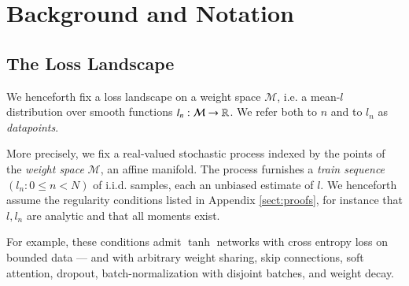 \documentclass{article}
\theoremstyle{plain}
\theoremstyle{definition}
\newcommand{\Mm}{\mathcal{M}}
\begin{document}
\section{Background and Notation} \label{sect:background}


    \subsection{The Loss Landscape}


        We henceforth fix a loss landscape on a weight space $\Mm$, i.e. a
        mean-$l$ distribution over smooth functions $l_n:\Mm\to\RR$.  We refer
        both to $n$ and to $l_n$ as \emph{datapoints}.


        More precisely, we fix a real-valued stochastic process indexed by the
        points of the \emph{weight space} $\Mm$, an affine manifold.  The
        process furnishes a \emph{train sequence} $(l_n: 0\leq n<N)$ of i.i.d.
        samples, each an unbiased estimate of $l$. We henceforth assume the
        regularity conditions listed in Appendix \ref{sect:proofs}, for
        instance that $l, l_n$ are analytic and that all moments exist.


        For example, these conditions admit $\tanh$ networks with cross entropy
        loss on bounded data --- and with arbitrary weight sharing, skip
        connections, soft attention, dropout, batch-normalization with disjoint
        batches, and weight decay.
        
\end{document}

